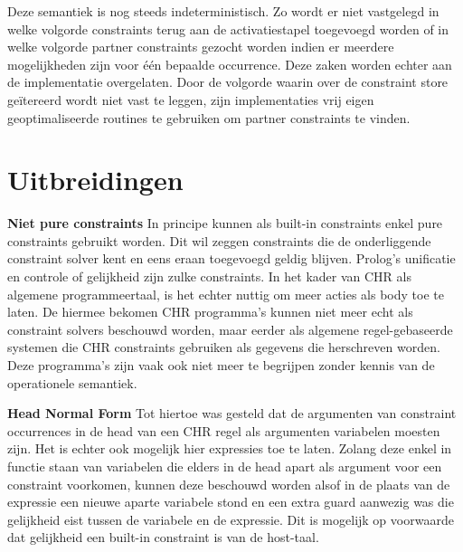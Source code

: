 Deze semantiek is nog steeds indeterministisch. Zo wordt er niet vastgelegd in welke volgorde constraints terug aan de activatiestapel toegevoegd worden of in welke volgorde partner constraints gezocht worden indien er meerdere mogelijkheden zijn voor \'e\'en bepaalde occurrence. Deze zaken worden echter aan de implementatie overgelaten. Door de volgorde waarin over de constraint store ge\"itereerd wordt niet vast te leggen, zijn implementaties vrij eigen geoptimaliseerde routines te gebruiken om partner constraints te vinden.

\section{Uitbreidingen}

{\bf Niet pure constraints} In principe kunnen als built-in constraints enkel pure constraints gebruikt worden. Dit wil zeggen constraints die de onderliggende constraint solver kent en eens eraan toegevoegd geldig blijven. Prolog's unificatie en controle of gelijkheid zijn zulke constraints. In het kader van CHR als algemene programmeertaal, is het echter nuttig om meer acties als body toe te laten. De hiermee bekomen CHR programma's kunnen niet meer echt als constraint solvers beschouwd worden, maar eerder als algemene regel-gebaseerde systemen die CHR constraints gebruiken als gegevens die herschreven worden. Deze programma's zijn vaak ook niet meer te begrijpen zonder kennis van de operationele semantiek.

{\bf Head Normal Form} Tot hiertoe was gesteld dat de argumenten van constraint occurrences in de head van een CHR regel als argumenten variabelen moesten zijn. Het is echter ook mogelijk hier expressies toe te laten. Zolang deze enkel in functie staan van variabelen die elders in de head apart als argument voor een constraint voorkomen, kunnen deze beschouwd worden alsof in de plaats van de expressie een nieuwe aparte variabele stond en een extra guard aanwezig was die gelijkheid eist tussen de variabele en de expressie. Dit is mogelijk op voorwaarde dat gelijkheid een built-in constraint is van de host-taal.

